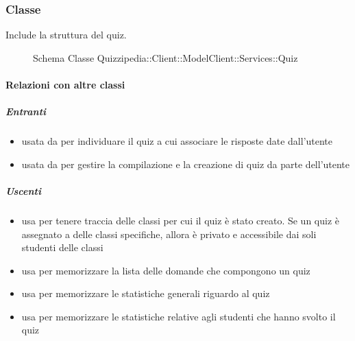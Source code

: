 \subsubsection{Classe }
Include la struttura del quiz.
\begin{figure}[H]
\centering
\noindent{}
\caption[Schema Classe Quiz]{Schema Classe Quizzipedia::Client::ModelClient::Services::Quiz}
\end{figure}
\paragraph{Relazioni con altre classi}
\subparagraph{Entranti}
\begin{itemize}
\item usata da  per individuare il quiz a cui associare le risposte date dall'utente
\item usata da  per gestire la compilazione e la creazione di quiz da parte dell'utente
\end{itemize}
\subparagraph{Uscenti}
\begin{itemize}
\item usa  per tenere traccia delle classi per
cui il quiz è stato creato. Se un quiz è assegnato a delle classi specifiche, allora è privato e
accessibile dai soli studenti delle classi
\item usa  per memorizzare la lista delle domande che compongono un quiz
\item usa  per memorizzare le statistiche generali riguardo al quiz
\item usa  per memorizzare le statistiche relative agli studenti che hanno svolto il quiz
\end{itemize}
